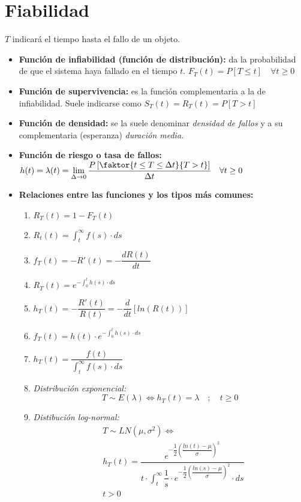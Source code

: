 \documentclass[a4paper, twocolumn, 10pt]{article}
\begin{document}
\section{Fiabilidad}

$T$ indicará el tiempo hasta el fallo de un objeto.

\begin{itemize}
	\item \textbf{Función de infiabilidad (función de distribución):} da la probabilidad de que el sistema haya fallado en el tiempo $t$. $F_T(t) = P\left[T\leq t\right] \quad \forall t\ge 0$
	\item \textbf{Función de supervivencia:} es la función complementaria a la de infiabilidad. Suele indicarse como $S_T(t) = R_T(t) = P\left[T > t \right]$
	\item \textbf{Función de densidad:} se la suele denominar \textit{densidad de fallos} y a su complementaria (esperanza) \textit{duración media.}
	\item \textbf{Función de riesgo o tasa de fallos:} $h(t) = \lambda(t) = \lim\limits_{\Delta\rightarrow0}\dfrac{P\left[\faktor{t\leq T \leq \Delta t}{T>t}\right]}{\Delta t} \quad \forall t\ge 0$
	\item \textbf{Relaciones entre las funciones y los tipos más comunes:}
	\begin{enumerate}
		\item $R_T(t) = 1 - F_T(t)$
		\item $R_t(t) = \displaystyle \int_{t}^{\infty}f(s)\cdot ds$
		\item $f_T(t) = -R'(t) = -\dfrac{dR(t)}{dt}$
		\item $R_T(t) = e^{\displaystyle -\int_{0}^{t}h(s)\cdot ds}$
		\item $h_T(t) = -\dfrac{R'(t)}{R(t)} = -\dfrac{d}{dt}\left[ln(R(t))\right]$
		\item $f_T(t) = h(t)\cdot e^{\displaystyle -\int_{0}^{t}h(s)\cdot ds}$
		\item $h_T(t) = \dfrac{f(t)}{\displaystyle \int_{t}^{\infty}f(s)\cdot ds}$
		\item \textit{Distribución exponencial:}
		\begin{equation*}
			T\sim E(\lambda) \Leftrightarrow h_T(t) = \lambda \quad ;\quad t\ge 0
		\end{equation*}
		\item \textit{Distibución log-normal:}
		\begin{eqnarray*}
			&T\sim LN(\mu, \sigma^2) \Leftrightarrow \\ &h_T(t) = \dfrac{e^{ -\dfrac{1}{2}\left(\dfrac{ln(t)-\mu}{\sigma}\right)^2}}{t\cdot \displaystyle \int_{t}^{\infty}\dfrac{1}{s}\cdot e^{-\dfrac{1}{2}\left(\dfrac{ln(s)-\mu}{\sigma}\right)^2}\cdot ds} \\ & t>0
		\end{eqnarray*}
	\end{enumerate}
\end{itemize}
\end{document}
